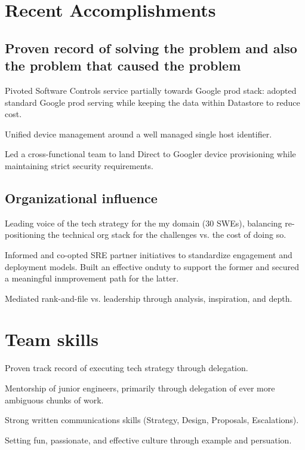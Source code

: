 \documentclass{resume}
\newcommand{\textapprox}{\raisebox{0.5ex}{\texttildelow}}
\begin{document}
\author{Dmitry Ratnikov}
\phone{}
\streetaddress{ }
\maketitle

\section{Recent Accomplishments}

\subsection{Proven record of solving the problem and also the problem that caused the problem}

\begin{compactitem}
\item Pivoted Software Controls service partially towards Google prod stack: adopted standard Google prod serving while keeping the data within Datastore to reduce cost.
\item Unified device management around a well managed single host identifier.
\item Led a cross-functional team to land Direct to Googler device provisioning while maintaining strict security requirements.
\end{compactitem}

\subsection{Organizational influence}
\begin{compactitem}
\item Leading voice of the tech strategy for the my domain (\textapprox 30 SWEs), balancing re-positioning the technical org stack for the challenges vs. the cost of doing so.
\item Informed and co-opted SRE partner initiatives to standardize engagement and deployment models. Built an effective onduty to support the former and secured a meaningful inmprovement path for the latter.
\item Mediated rank-and-file vs. leadership through analysis, inspiration, and depth.
\end{compactitem}

\section{Team skills}
\begin{compactitem}
\item Proven track record of executing tech strategy through delegation.
\item Mentorship of junior engineers, primarily through delegation of ever more ambiguous chunks of work.
\item Strong written communications skills (Strategy, Design, Proposals, Escalations).
\item Setting fun, passionate, and effective culture through example and persuation.
\end{compactitem}
\end{document}
